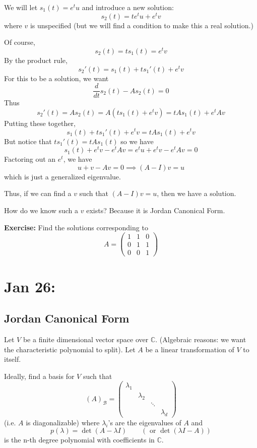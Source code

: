 \documentclass[12pt]{article}
\newcommand{\C}{\mathbb{C}}
\begin{document}
    We will let $s_1(t) = e^t u$ and introduce a new solution:
    \[s_2(t) = te^t u + e^t v\]
    where $v$ is unspecified (but we will find a condition to make this a real solution.)

    Of course, 
    \[s_2(t) = ts_1(t) = e^t v\]
    By the product rule, 
    \[s_2'(t) = s_1(t) + ts_1'(t) + e^tv\]
    For this to be a solution, we want 
    \[\frac{d}{dt}s_2(t) - As_2(t) = 0\]
    Thus
    \[s_2'(t) = As_2(t) = A(ts_1(t) + e^t v) = tAs_1(t) + e^t Av\]
    Putting these together, 
    \[s_1(t) + ts_1'(t) + e^t v = tAs_1(t) + e^t v\]
    But notice that $ts_1'(t) = tAs_1(t)$ so we have 
    \[s_1(t) + e^tv - e^tAv = e^t u + e^t v - e^t Av = 0\]
    Factoring out an $e^t$, we have 
    \[u + v - Av = 0 \implies (A - I)v =u\]
    which is just a generalized eigenvalue. 

    Thus, if we can find a $v$ such that $(A - I)v = u$, then we have a solution.

    How do we know such a $v$ exists? Because it is Jordan Canonical Form. 

    \textbf{Exercise:} Find the solutions corresponding to 
    \[A = \begin{pmatrix}
        1 & 1 & 0\\ 
        0 & 1 & 1\\
        0 & 0 & 1
    \end{pmatrix}\]

\section{Jan 26:}
\subsection*{Jordan Canonical Form}
    Let $V$ be a finite dimensional vector space over $\C$. (Algebraic reasons: we want the characteristic polynomial to split). Let $A$ be a linear transformation of $V$ to itself. 

    Ideally, find a basis for $V$ such that 
    \[(A)_{\mathcal{B}} = \begin{pmatrix}
        \lambda_1\\ 
        & \lambda_2\\ 
        & & \ddots\\ 
        & & & \lambda_d
    \end{pmatrix}\] 
    (i.e. $A$ is diagonalizable)
    where $\lambda_i$'s are the eigenvalues of $A$ and 
    \[p(\lambda) = \det(A -\lambda I) \qquad (\text{ or } \det(\lambda I - A))\]
    is the n-th degree polynomial with coefficients in $\C$.
\end{document}
